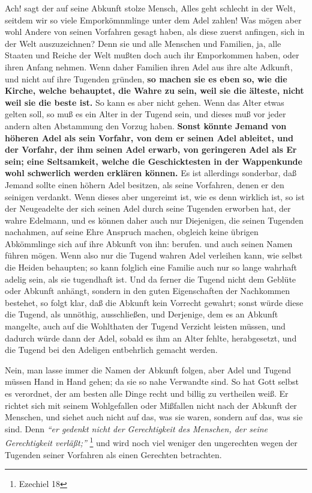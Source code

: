 Ach! sagt der auf seine Abkunft stolze Mensch, Alles geht schlecht in der Welt,
seitdem wir so viele Emporkömnmlinge unter dem Adel
zahlen! Was mögen aber wohl
Andere von seinen Vorfahren gesagt haben, als diese zuerst anfingen, sich in der
Welt auszuzeichnen? Denn sie und alle Menschen und Familien, ja, alle Staaten
und Reiche der Welt mußten doch auch ihr Emporkommen haben, oder ihren Anfang
nehmen. Wenn daher Familien ihren Adel aus ihre alte Adkunft, und nicht auf ihre
Tugenden gründen, \textbf{so machen sie es eben so, wie  die Kirche, welche behauptet,
die Wahre zu sein, weil sie die älteste, nicht weil sie die beste ist.} So kann
es aber nicht gehen. Wenn das Alter etwas gelten soll, so muß es ein Alter in
der Tugend sein, und dieses muß vor jeder andern alten Abstammung den Vorzug
haben. \textbf{Sonst könnte Jemand von höheren Adel als sein Vorfahr, von dem er
seinen
Adel ableitet, und der Vorfahr, der ihm seinen Adel erwarb, von geringeren Adel
als Er sein; eine Seltsamkeit, welche die Geschicktesten in der
Wappenkunde wohl
schwerlich werden erklären können.} Es ist allerdings sonderbar, daß Jemand
sollte einen höhern Adel besitzen, als seine Vorfahren, denen er den seinigen
verdankt. Wenn dieses aber ungereimt ist, wie es denn wirklich ist, so ist der
Neugeadelte der sich seinen Adel durch seine Tugenden erworben hat, der wahre
Edelmann, und es können daher auch nur Diejenigen, die seinen Tugenden
nachahmen, auf seine Ehre Anspruch machen, obgleich keine übrigen Abkömmlinge
sich auf ihre Abkunft von ihn: berufen. und auch seinen Namen führen mögen. Wenn
also nur die Tugend wahren Adel verleihen kann, wie selbst die
Heiden behaupten;
so kann folglich eine Familie auch nur so lange wahrhaft adelig sein, als sie
tugendhaft ist. Und da ferner die Tugend nicht dem Geblüte oder Abkunft anhängt,
sondern in den guten Eigenschaften der Nachkommen bestehet, so folgt klar, daß
die Abkunft kein Vorrecht gewahrt; sonst würde diese die Tugend, als unnöthig,
ausschließen, und Derjenige, dem es an Abkunft mangelte, auch auf die Wohlthaten
der Tugend Verzicht leisten müssen, und dadurch würde dann der Adel, sobald es
ihm an Alter fehlte, herabgesetzt, und die Tugend bei den Adeligen entbehrlich
gemacht werden.

\medskip

Nein, man lasse immer die Namen der Abkunft folgen, aber Adel und Tugend müssen
Hand in Hand gehen; da sie so nahe Verwandte sind. So hat Gott selbst es
verordnet, der am besten alle Dinge recht und billig zu vertheilen weiß. Er
richtet sich mit seinem Wohlgefallen oder Mißfallen nicht nach der Abkunft der
Menschen, und siehet auch nicht auf das, was sie waren, sondern auf das, was sie
sind. Denn
\textit{"`er gedenkt nicht der Gerechtigkeit des Menschen, der seine
Gerechtigkeit verläßt;"'}
\footnote{Ezechiel 18}
und wird noch viel weniger den
ungerechten wegen der Tugenden seiner Vorfahren als einen Gerechten betrachten.

